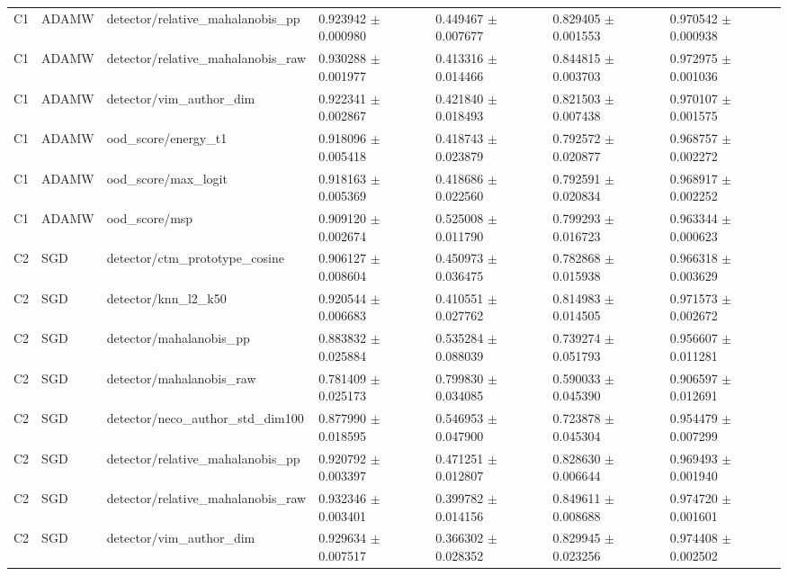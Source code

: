 \begin{longtable}{lllllll}
C1 & ADAMW & detector/relative\_mahalanobis\_pp & 0.923942 $\pm$ 0.000980 & 0.449467 $\pm$ 0.007677 & 0.829405 $\pm$ 0.001553 & 0.970542 $\pm$ 0.000938 \\
C1 & ADAMW & detector/relative\_mahalanobis\_raw & 0.930288 $\pm$ 0.001977 & 0.413316 $\pm$ 0.014466 & 0.844815 $\pm$ 0.003703 & 0.972975 $\pm$ 0.001036 \\
C1 & ADAMW & detector/vim\_author\_dim & 0.922341 $\pm$ 0.002867 & 0.421840 $\pm$ 0.018493 & 0.821503 $\pm$ 0.007438 & 0.970107 $\pm$ 0.001575 \\
C1 & ADAMW & ood\_score/energy\_t1 & 0.918096 $\pm$ 0.005418 & 0.418743 $\pm$ 0.023879 & 0.792572 $\pm$ 0.020877 & 0.968757 $\pm$ 0.002272 \\
C1 & ADAMW & ood\_score/max\_logit & 0.918163 $\pm$ 0.005369 & 0.418686 $\pm$ 0.022560 & 0.792591 $\pm$ 0.020834 & 0.968917 $\pm$ 0.002252 \\
C1 & ADAMW & ood\_score/msp & 0.909120 $\pm$ 0.002674 & 0.525008 $\pm$ 0.011790 & 0.799293 $\pm$ 0.016723 & 0.963344 $\pm$ 0.000623 \\
C2 & SGD & detector/ctm\_prototype\_cosine & 0.906127 $\pm$ 0.008604 & 0.450973 $\pm$ 0.036475 & 0.782868 $\pm$ 0.015938 & 0.966318 $\pm$ 0.003629 \\
C2 & SGD & detector/knn\_l2\_k50 & 0.920544 $\pm$ 0.006683 & 0.410551 $\pm$ 0.027762 & 0.814983 $\pm$ 0.014505 & 0.971573 $\pm$ 0.002672 \\
C2 & SGD & detector/mahalanobis\_pp & 0.883832 $\pm$ 0.025884 & 0.535284 $\pm$ 0.088039 & 0.739274 $\pm$ 0.051793 & 0.956607 $\pm$ 0.011281 \\
C2 & SGD & detector/mahalanobis\_raw & 0.781409 $\pm$ 0.025173 & 0.799830 $\pm$ 0.034085 & 0.590033 $\pm$ 0.045390 & 0.906597 $\pm$ 0.012691 \\
C2 & SGD & detector/neco\_author\_std\_dim100 & 0.877990 $\pm$ 0.018595 & 0.546953 $\pm$ 0.047900 & 0.723878 $\pm$ 0.045304 & 0.954479 $\pm$ 0.007299 \\
C2 & SGD & detector/relative\_mahalanobis\_pp & 0.920792 $\pm$ 0.003397 & 0.471251 $\pm$ 0.012807 & 0.828630 $\pm$ 0.006644 & 0.969493 $\pm$ 0.001940 \\
C2 & SGD & detector/relative\_mahalanobis\_raw & 0.932346 $\pm$ 0.003401 & 0.399782 $\pm$ 0.014156 & 0.849611 $\pm$ 0.008688 & 0.974720 $\pm$ 0.001601 \\
C2 & SGD & detector/vim\_author\_dim & 0.929634 $\pm$ 0.007517 & 0.366302 $\pm$ 0.028352 & 0.829945 $\pm$ 0.023256 & 0.974408 $\pm$ 0.002502 \\

\end{longtable}
